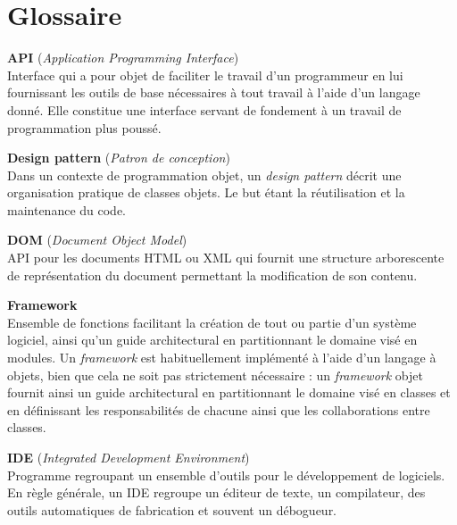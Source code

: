 \chapter*{Glossaire}
\pagestyle{empty}

\textbf{API} (\textit{Application Programming Interface})\\
Interface qui a pour objet de faciliter le travail d'un programmeur en lui fournissant les outils de base n\'ecessaires \`a tout travail \`a l'aide d'un langage donn\'e.
Elle constitue une interface servant de fondement \`a un travail de programmation plus pouss\'e.

\vspace{0.5cm}

\textbf{Design pattern} (\textit{Patron de conception})\\
Dans un contexte de programmation objet, un \textit{design pattern} d\'ecrit une organisation pratique de classes objets. 
Le but \'etant la r\'eutilisation et la maintenance du code.

\vspace{0.5cm}

\textbf{DOM} (\textit{Document Object Model})\\
API pour les documents HTML ou XML qui fournit une structure arborescente de repr\'esentation du document permettant la modification de son contenu.

\vspace{0.5cm}

\textbf{Framework}\\
Ensemble de fonctions facilitant la cr\'eation de tout ou partie d'un syst\`eme logiciel, ainsi qu'un guide architectural en partitionnant le domaine vis\'e en modules. 
Un \textit{framework} est habituellement impl\'ement\'e \`a l'aide d'un langage \`a objets, bien que cela ne soit pas strictement n\'ecessaire : un \textit{framework} objet fournit ainsi un guide architectural en partitionnant le domaine vis\'e en classes et en d\'efinissant les responsabilit\'es de chacune ainsi que les collaborations entre classes. 

\vspace{0.5cm}

\textbf{IDE} (\textit{Integrated Development Environment})\\
Programme regroupant un ensemble d'outils pour le d\'eveloppement de logiciels.
En r\`egle g\'en\'erale, un IDE regroupe un \'editeur de texte, un compilateur, des outils automatiques de fabrication et souvent un d\'ebogueur.

